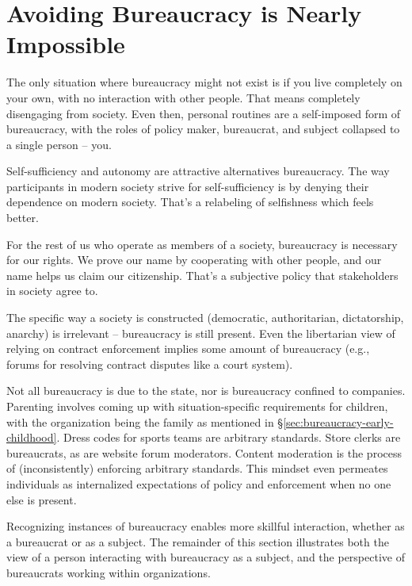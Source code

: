 \section{Avoiding Bureaucracy is Nearly Impossible}

The only situation where bureaucracy might not exist is if you live completely on your own, with no interaction with other people. That means completely disengaging from society. Even then, personal routines are a self-imposed form of bureaucracy, with the roles of policy maker, bureaucrat, and subject collapsed to a single person -- you.

Self-sufficiency and autonomy are attractive alternatives bureaucracy. The way participants in modern society strive for self-sufficiency is by denying their dependence on modern society. That's a relabeling of selfishness which feels better. 

For the rest of us who operate as members of a society, bureaucracy is necessary for our rights. We prove our name by cooperating with other people, and our name helps us claim our citizenship. That's a subjective policy that \glspl{stakeholder} in society agree to. 



The specific way a society is constructed (democratic, authoritarian, dictatorship, anarchy) is irrelevant -- bureaucracy is still present. Even the libertarian view of relying on contract enforcement implies some amount of bureaucracy (e.g., forums for resolving contract disputes like a court system). 


Not all bureaucracy is due to the state, nor is bureaucracy confined to companies. Parenting involves coming up with situation-specific requirements for children, with the organization being the family as mentioned in \S\ref{sec:bureaucracy-early-childhood}. Dress codes for sports teams are arbitrary standards. 
Store clerks are bureaucrats, as are website forum moderators.  Content moderation is the process of (inconsistently) enforcing arbitrary standards. This mindset even permeates individuals as internalized expectations of policy and enforcement when no one else is present. 

Recognizing instances of bureaucracy enables more skillful interaction, whether as a bureaucrat or as a subject. The remainder of this section  illustrates both the view of a person interacting with bureaucracy as a \gls{subject}, and the perspective of bureaucrats working within organizations. 




